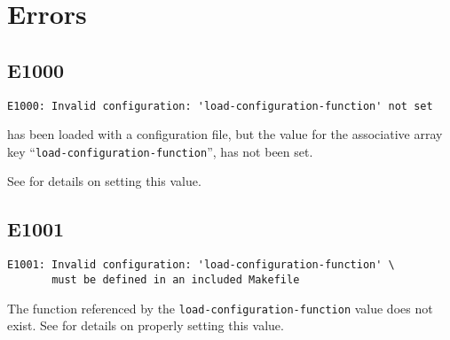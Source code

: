 %
%
%
%
\chapter{Errors}

\section{E1000}

\begin{footnotesize}
\begin{verbatim}
E1000: Invalid configuration: 'load-configuration-function' not set
\end{verbatim}
\end{footnotesize}

\lmsbw has been loaded with a configuration file, but the value for
the associative array key ``\texttt{load-configuration-function}'',
has not been set.

See  for details on
setting this value.

\section{E1001}

\begin{footnotesize}
\begin{verbatim}
E1001: Invalid configuration: 'load-configuration-function' \
       must be defined in an included Makefile
\end{verbatim}
\end{footnotesize}

The function referenced by the \texttt{load-configuration-function}
value does not exist.  See
 for details on properly
setting this value.

